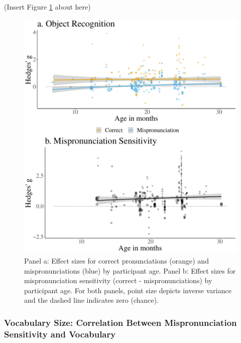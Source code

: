 \documentclass[man]{apa6}
\begin{document}
(Insert Figure \ref{fig:PlotMPEffect} about here)

\begin{figure}
\centering
\includegraphics{VonHolzenBergmann_MPMetaAnalysis_files/figure-latex/PlotMPEffect-1.pdf}
\caption{\label{fig:PlotMPEffect}Panel a: Effect sizes for correct pronunciations (orange) and mispronunciations (blue) by participant age. Panel b: Effect sizes for mispronunciation sensitivity (correct - mispronunciations) by participant age. For both panels, point size depicts inverse variance and the dashed line indicates zero (chance).}
\end{figure}

\hypertarget{vocabulary-size-correlation-between-mispronunciation-sensitivity-and-vocabulary}{%
\subsubsection{Vocabulary Size: Correlation Between Mispronunciation Sensitivity and Vocabulary}\label{vocabulary-size-correlation-between-mispronunciation-sensitivity-and-vocabulary}}
\end{document}
